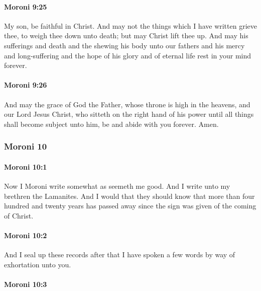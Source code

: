 		\paragraph{Moroni 9:25} %
			\label{MORONI-9-25}

			My son, be faithful in Christ.
			And may not the things which I have written grieve thee,
			to weigh thee down unto death;
			but may Christ lift thee up.
			And may his sufferings and death and the shewing his body unto our fathers
			and his mercy and long-suffering
			and the hope of his glory and of eternal life
			rest in your mind forever.

		\paragraph{Moroni 9:26} %
			\label{MORONI-9-26}

			And may the grace of God the Father,
			whose throne is high in the heavens,
			and our Lord Jesus Christ,
			who sitteth on the right hand of his power
			until all things shall become subject unto him,
			be and abide with you forever.
			Amen.
			
	\subsubsection{Moroni 10} %
		\label{MORONI-10}

		\paragraph{Moroni 10:1} %
			\label{MORONI-10-1}

			Now I Moroni write somewhat as seemeth me good.
			And I write unto my brethren the Lamanites.
			And I would that they should know
			that more than four hundred and twenty years has passed away
			since the sign was given of the coming of Christ.

		\paragraph{Moroni 10:2} %
			\label{MORONI-10-2}

			And I seal up these records
			after that I have spoken a few words by way of exhortation unto you.

		\paragraph{Moroni 10:3} %
			\label{MORONI-10-3}

